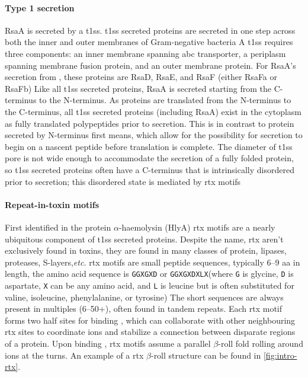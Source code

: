 \paragraph{Type 1 secretion} RsaA is secreted by a \ac{t1ss}. \Ac{t1ss} secreted proteins are secreted in one step across both the inner and outer membranes of Gram-negative bacteria A \ac{t1ss} requires three components: an inner membrane spanning \ac{abc} transporter, a periplasm spanning membrane fusion protein, and an outer membrane protein. For RsaA's secretion from \caulobacter, these proteins are RsaD, RsaE, and RsaF (either RsaFa or RsaFb) Like all \ac{t1ss} secreted proteins, RsaA is secreted starting from the C-terminus to the N-terminus. As proteins are translated from the N-terminus to the C-terminus, all \ac{t1ss} secreted proteins (including RsaA) exist in the cytoplasm as fully translated polypeptides prior to secretion. This is in contrast to protein secreted by N-terminus first means, which allow for the possibility for secretion to begin on a nascent peptide before translation is complete. The diameter of \ac{t1ss} pore is not wide enough to accommodate the secretion of a fully folded protein, so \ac{t1ss} secreted proteins often have a C-terminus that is intrinsically disordered prior to secretion; this disordered state is mediated by \ac{rtx} motifs   

  \paragraph{Repeat-in-toxin motifs} \label{sec:repeat-toxin-motifs} First identified in the \ecoli protein $\alpha$-haemolysin (HlyA) \ac{rtx} motifs are a nearly ubiquitous component of \ac{t1ss} secreted proteins. Despite the name, \acl{rtx} aren't exclusively found in toxins, they are found in many classes of protein, lipases, proteases, S-layers,\textit{etc.}  \ac{rtx} motifs are small peptide sequences, typically 6--9 \ac{aa} in length, the amino acid sequence is \texttt{GGXGXD} or \texttt{GGXGXDXLX}(where \texttt{G} is glycine, \texttt{D} is aspartate, \texttt{X} can be any amino acid, and \texttt{L} is leucine but is often substituted for valine, isoleucine, phenylalanine, or tyrosine) The short sequences are always present in multiples (6--50+), often found in tandem repeats. Each \ac{rtx} motif forms two half sites for binding , which can collaborate with other neighbouring \ac{rtx} sites to coordinate ions and stabilize a connection between disparate regions of a protein. Upon binding , \ac{rtx} motifs assume a parallel $\beta$-roll fold rolling around  ions at the turns. An example of a \ac{rtx} $\beta$-roll structure can be found in \cref{fig:intro-rtx}.

